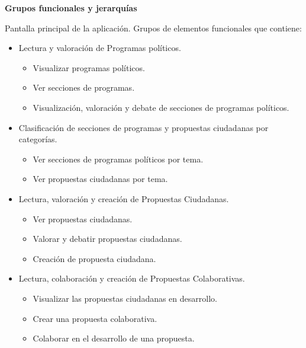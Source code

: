 \textbf{Grupos funcionales y jerarquías}

Pantalla principal de la aplicación. Grupos de elementos funcionales que contiene:

\begin{itemize}
 \item Lectura y valoración de Programas políticos.
 \begin{itemize}
  \item Visualizar programas políticos.
  \item Ver secciones de programas.
  \item Visualización, valoración y debate de secciones de programas políticos.
 \end{itemize}
\end{itemize}

\begin{itemize}
 \item Clasificación de secciones de programas y propuestas ciudadanas por categorías.
 \begin{itemize}
  \item Ver secciones de programas políticos por tema.
  \item Ver propuestas ciudadanas por tema.
 \end{itemize}
\end{itemize}

\begin{itemize}
 \item Lectura, valoración y creación de Propuestas Ciudadanas.
 \begin{itemize}
  \item Ver propuestas ciudadanas.
  \item Valorar y debatir propuestas ciudadanas.
  \item Creación de propuesta ciudadana.
 \end{itemize}
\end{itemize}

\begin{itemize}
 \item Lectura, colaboración y creación de Propuestas Colaborativas.
 \begin{itemize}
  \item Visualizar las propuestas ciudadanas en desarrollo.
  \item Crear una propuesta colaborativa.
  \item Colaborar en el desarrollo de una propuesta.
 \end{itemize}
\end{itemize}

